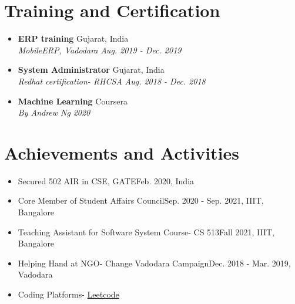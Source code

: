 \documentclass[letterpaper,11pt]{article}
\makeatletter
\newcommand{\resumeItem}[2]{
  \item\small{
    {#1}\hfill{#2}%
  }
}
\newcommand{\resumeSubheading}[4]{
\item\textbf{#1} \hfill #2\null\\
 \textit{\small#3} \hfill \textit{\small#4}%
}
\newcommand{\resumeSubHeadingListEnd}{\end{itemize}}
\newcommand{\resumeItemListStart}{\begin{itemize}}
\newcommand{\resumeItemListEnd}{\end{itemize}\vspace{-5pt}}
\makeatother
\begin{document}
\section{Training and Certification}
\resumeItemListStart
\resumeSubheading
{ERP training}{Gujarat, India}
{MobileERP, Vadodara}{Aug. 2019 - Dec. 2019}
\resumeSubheading
{System Administrator}{Gujarat, India}
{Redhat certification- RHCSA}{Aug. 2018 - Dec. 2018}
\resumeSubheading
{Machine Learning}{Coursera}
{By Andrew Ng}{2020}
\resumeSubHeadingListEnd

\section{Achievements and Activities}
\resumeItemListStart
\resumeItem{Secured 502 AIR in CSE, GATE}{Feb. 2020, India}
\resumeItem{Core Member of Student Affairs Council}{Sep. 2020 - Sep. 2021, IIIT, Bangalore}
\resumeItem
{Teaching Assistant for Software System Course- CS 513}{Fall 2021, IIIT, Bangalore}
\resumeItem
{Helping Hand at NGO- Change Vadodara Campaign}{Dec. 2018 - Mar. 2019, Vadodara}
\resumeItem
{Coding Platforms- \href{https://leetcode.com/babaji_420/}{Leetcode}\href{}{}}{}
\resumeItemListEnd
\end{document}
